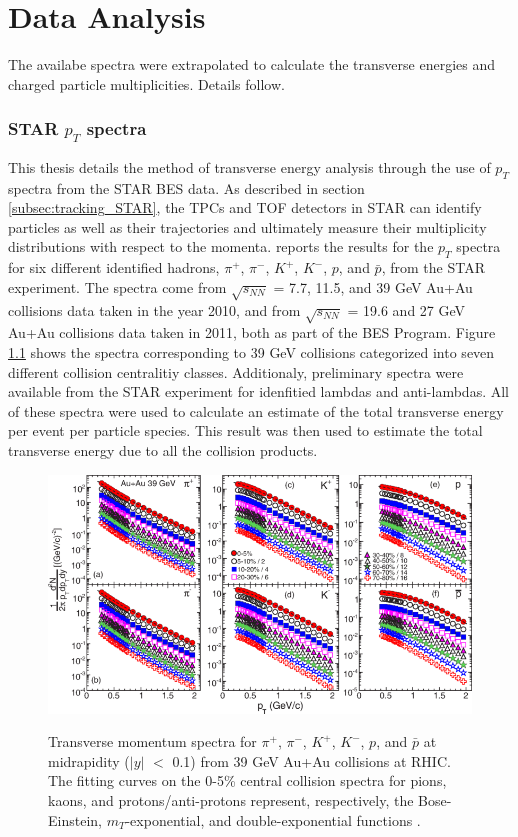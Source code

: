 \chapter{Data Analysis} \label{ch:analysis}
The availabe spectra were extrapolated to calculate the transverse energies and charged particle multiplicities. Details follow.

\subsection{STAR $p_{T}$ spectra}
This thesis details the method of transverse energy analysis through the use of $p_{T}$ spectra from the STAR BES data. As described in section \ref{subsec:tracking_STAR}, the TPCs and TOF detectors in STAR can identify particles as well as their trajectories and ultimately measure their multiplicity distributions with respect to the momenta. \citet{PhysRevC.96.044904} reports the results for the $p_{T}$ spectra for six different identified hadrons, $\pi^+$, $\pi^-$, $K^+$, $K^-$, $p$, and $\bar{p}$, from the STAR experiment. The spectra come from $\sqrt{s_{NN}}$ = 7.7, 11.5, and 39 GeV Au+Au collisions data taken in the year 2010, and from $\sqrt{s_{NN}}$ = 19.6 and 27 GeV Au+Au collisions data taken in 2011, both as part of the BES Program. Figure \ref{fig:BESPaper_pTSpectra} \cite{PhysRevC.96.044904} shows the spectra corresponding to 39 GeV collisions categorized into seven different collision centralitiy classes. Additionaly, preliminary spectra were available from the STAR experiment for idenfitied lambdas and anti-lambdas. All of these spectra were used to calculate an estimate of the total transverse energy per event per particle species. This result was then used to estimate the total transverse energy due to all the collision products.
\begin{figure}[h]
  \centering
  \includegraphics[width=6.5in]{../figures/PhysRevC-96-044904_pTSpectra_39.png}\\
  \caption{Transverse momentum spectra for $\pi^{+}$, $\pi^{-}$, $K^+$, $K^{-}$, $p$, and $\bar{p}$ at midrapidity ($|y|$ $<$ 0.1) from 39 GeV Au+Au collisions at RHIC. The fitting curves on the 0-5\% central collision spectra for pions, kaons, and protons/anti-protons represent, respectively, the Bose-Einstein, $m_{T}$-exponential, and double-exponential functions \cite{PhysRevC.96.044904}.}\label{fig:BESPaper_pTSpectra}
\end{figure}

